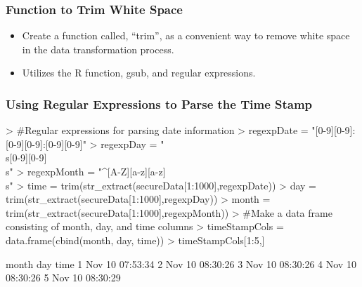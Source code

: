 \documentclass[compress,8pt]{beamer}
\begin{document}
\begin{frame}
  \frametitle{Function to Trim White Space}  
  \begin{itemize}
  \item Create a function called, ``trim'', as a convenient way to remove white space in the data transformation process.
  \item Utilizes the R function, gsub, and regular expressions.
  \end{itemize}  
\begin{Schunk}
\end{Schunk}
\end{frame}

\begin{frame}
\frametitle{Using Regular Expressions to Parse the Time Stamp}  
\begin{Schunk}
\begin{Sinput}
> #Regular expressions for parsing date information
> regexpDate = "[0-9][0-9]:[0-9][0-9]:[0-9][0-9]"
> regexpDay = "\\s[0-9][0-9]\\s"
> regexpMonth = "^[A-Z][a-z][a-z]\\s"
> time = trim(str_extract(secureData[1:1000],regexpDate))
> day = trim(str_extract(secureData[1:1000],regexpDay))
> month = trim(str_extract(secureData[1:1000],regexpMonth))
> #Make a data frame consisting of month, day, and time columns
> timeStampCols = data.frame(cbind(month, day, time))
> timeStampCols[1:5,]
\end{Sinput}
  month day     time
1   Nov  10 07:53:34
2   Nov  10 08:30:26
3   Nov  10 08:30:26
4   Nov  10 08:30:26
5   Nov  10 08:30:29\end{Schunk}
\end{frame}
\end{document}
